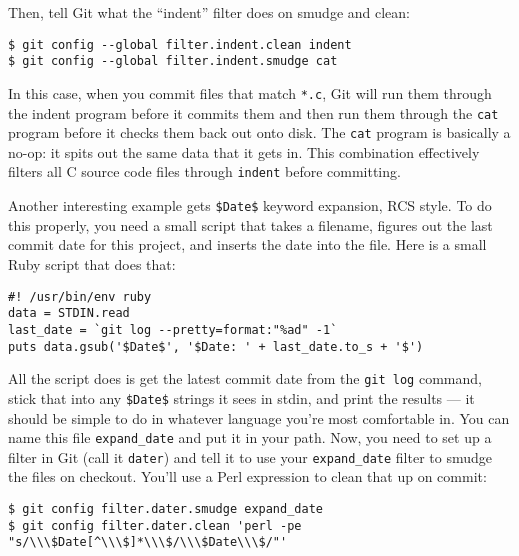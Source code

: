 \documentclass[a4paper]{book}
\newcounter{tab}[chapter]
\begin{document}
Then, tell Git what the “indent” filter does on smudge and clean:

\begin{shaded}\begin{verbatim}
$ git config --global filter.indent.clean indent
$ git config --global filter.indent.smudge cat
\end{verbatim}\end{shaded}

In this case, when you commit files that match \texttt{*.c}, Git will run them through the indent program before it commits them and then run them through the \texttt{cat} program before it checks them back out onto disk. The \texttt{cat} program is basically a no-op: it spits out the same data that it gets in. This combination effectively filters all C source code files through \texttt{indent} before committing.

Another interesting example gets \texttt{\$Date\$} keyword expansion, RCS style. To do this properly, you need a small script that takes a filename, figures out the last commit date for this project, and inserts the date into the file. Here is a small Ruby script that does that:

\begin{shaded}\begin{verbatim}
#! /usr/bin/env ruby
data = STDIN.read
last_date = `git log --pretty=format:"%ad" -1`
puts data.gsub('$Date$', '$Date: ' + last_date.to_s + '$')
\end{verbatim}\end{shaded}

All the script does is get the latest commit date from the \texttt{git log} command, stick that into any \texttt{\$Date\$} strings it sees in stdin, and print the results --- it should be simple to do in whatever language you're most comfortable in. You can name this file \texttt{expand\_date} and put it in your path. Now, you need to set up a filter in Git (call it \texttt{dater}) and tell it to use your \texttt{expand\_date} filter to smudge the files on checkout. You'll use a Perl expression to clean that up on commit:

\begin{shaded}\begin{verbatim}
$ git config filter.dater.smudge expand_date
$ git config filter.dater.clean 'perl -pe "s/\\\$Date[^\\\$]*\\\$/\\\$Date\\\$/"'
\end{verbatim}\end{shaded}
\end{document}
